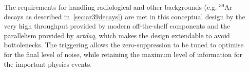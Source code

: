 
The requirements for handling radiological and other backgrounds (e.g. $^{39}$Ar decays as described
in~\ref{sec:ar39decays}) are met in this conceptual design by the very high throughput provided by modern
off-the-shelf components  and the parallelism provided by \textit{artdaq}, which makes the design extendable to avoid bottolenecks.  The triggering
allows the zero-suppression to be tuned to optimise for the final
level of noise, while retaining the maximum level of information for
the important physics events.


